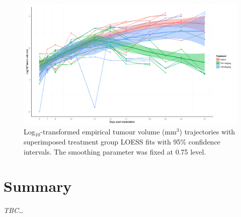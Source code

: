 \begin{figure}
	\centering
	\includegraphics[width=\textwidth]{xenograph/figures/loess_trajectories_log_reduced_follow-up.png}
	\caption{Log$_{10}$-transformed empirical tumour volume (mm$^3$) trajectories with superimposed treatment group LOESS fits with 95\% confidence intervals.
	The smoothing parameter was fixed at 0.75 level.}
	\label{loess_trajectories_log_reduced_follow-up}
\end{figure}


\section{Summary}
\emph{\emph{TBC\ldots}}
